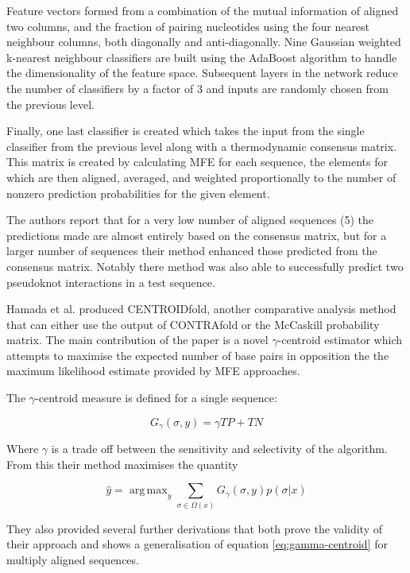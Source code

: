 \documentclass[journal]{IEEEtran}
\DeclareMathOperator*{\argmax}{arg\,max}
\begin{document}
Feature vectors formed from a combination of the mutual information of aligned two columns, and the fraction of pairing nucleotides using the four nearest neighbour columns, both diagonally and anti-diagonally. Nine Gaussian weighted k-nearest neighbour classifiers are built using the AdaBoost algorithm to handle the dimensionality of the feature space. Subsequent layers in the network reduce the number of classifiers by a factor of 3 and inputs are randomly chosen from the previous level. 

Finally, one last classifier is created which takes the input from the single classifier from the previous level along with a thermodynamic consensus matrix. This matrix is created by calculating MFE for each sequence, the elements for which are then aligned, averaged, and weighted proportionally to the number of nonzero prediction probabilities for the given element.

The authors report that for a very low number of aligned sequences (5) the predictions made are almost entirely based on the consensus matrix, but for a larger number of sequences their method enhanced those predicted from the consensus matrix. Notably there method was also able to successfully predict two pseudoknot interactions in a test sequence.

Hamada et al. \cite{hamada2009prediction, sato2009centroidfold} produced CENTROIDfold, another comparative analysis method that can either use the output of CONTRAfold or the McCaskill probability matrix. The main contribution of the paper is a novel $\gamma$-centroid estimator which attempts to maximise the expected number of base pairs in opposition the the maximum likelihood estimate provided by MFE approaches. 

The $\gamma$-centroid measure is defined for a single sequence:

\begin{equation}
	G_\gamma(\sigma, y) = \gamma TP + TN
\end{equation}

Where $\gamma$ is a trade off  between the sensitivity and selectivity of the algorithm. From this their method maximises the quantity

\begin{equation}
\label{eq:gamma-centroid}
	\hat{y} = \argmax_{y} \sum_{\sigma \in \Omega(x)} G_\gamma(\sigma, y) p(\sigma | x)
\end{equation}

They also provided several further derivations that both prove the validity of their approach and shows a generalisation of equation \ref{eq:gamma-centroid} for multiply aligned sequences.
\end{document}
